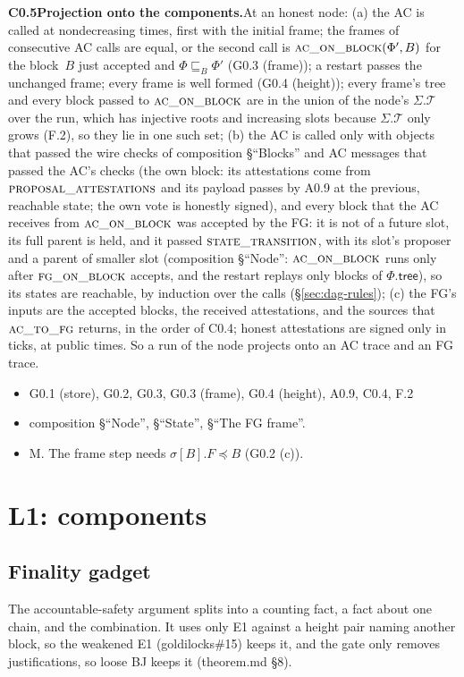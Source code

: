 \documentclass{article}
\newcommand{\T}{\mathcal T}
\newcommand{\Fr}{\Phi}
\newcommand{\fname}[1]{\text{\textsc{#1}}}
\newcommand{\dagnode}[6]{%
\par\medskip\noindent\textbf{#1\enspace #2.}\enspace #3
\begin{itemize}[leftmargin=2.2em,itemsep=0pt,topsep=2pt]
\item[\emph{Uses}] #4
\item[\emph{Evid.}] #5
\item[\emph{Task}] #6
\end{itemize}}
\begin{document}
\dagnode{C0.5}{Projection onto the components}{At an honest node: (a) the AC
is called at nondecreasing times, first with the initial frame; the frames of
consecutive AC calls are equal, or the second call is
$\fname{ac\_on\_block}(\Fr',B)$ for the block~$B$ just accepted and
$\Fr\sqsubseteq_B\Fr'$ (G0.3 (frame)); a restart passes the unchanged frame;
every frame is well formed (G0.4 (height)); every frame's tree and every block
passed to $\fname{ac\_on\_block}$ are in the union of the node's $\Sigma.\T$
over the run, which has injective roots and increasing slots because
$\Sigma.\T$ only grows (F.2), so they lie in one such set; (b) the AC is called only with
objects that passed the wire checks of composition \S``Blocks'' and AC
messages that passed the AC's checks (the own block: its attestations come
from $\fname{proposal\_attestations}$ and its payload passes by A0.9 at the
previous, reachable state; the own vote is honestly signed), and every block
that the AC receives from $\fname{ac\_on\_block}$ was accepted by the FG: it is
not of a future slot, its full parent is held, and it passed
$\fname{state\_transition}$, with its slot's proposer and a parent of smaller
slot (composition \S``Node'': $\fname{ac\_on\_block}$ runs only after
$\fname{fg\_on\_block}$ accepts, and the restart replays only blocks of
$\Fr.\mathsf{tree}$), so its states are reachable, by induction over the calls
(\S\ref{sec:dag-rules}); (c) the FG's inputs are the accepted blocks, the
received attestations, and the sources that $\fname{ac\_to\_fg}$ returns, in the
order of C0.4; honest attestations are signed only in ticks, at public times.
So a run of the node projects onto an AC trace and an FG trace.}
{G0.1 (store), G0.2, G0.3, G0.3 (frame), G0.4 (height), A0.9, C0.4, F.2}{composition
\S``Node'', \S``State'', \S``The FG frame''.}{M.  The frame step needs
$\sigma[B].F\preceq B$ (G0.2 (c)).}

\section{L1: components}\label{sec:l1}

\subsection{Finality gadget}

The accountable-safety argument splits into a counting fact, a fact about
one chain, and the combination.  It uses only E1 against a height pair
naming another block, so the weakened E1 (goldilocks\#15) keeps it, and the
gate only removes justifications, so loose BJ keeps it (theorem.md \S8).
\end{document}

